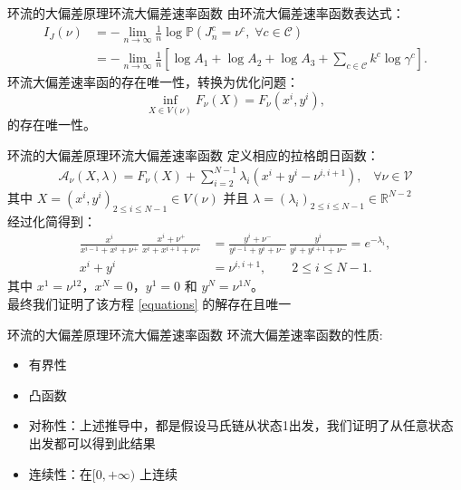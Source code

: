 \documentclass{beamer}
\begin{document}
\begin{frame}{环流的大偏差原理}{环流大偏差速率函数}
	由环流大偏差速率函数表达式：
	\begin{equation*}
		\begin{split}
			I_J(\nu) &= -\lim_{n\to\infty}\frac{1}{n}\log\mathbb{P}\left(J^c_n=\nu^c,\;\forall c\in\mathcal{C}\right)\\
			&= -\lim_{n\to\infty}\frac{1}{n}\left[\log A_1+\log A_2+\log A_3+\sum_{c\in\mathcal{C}}k^c\log\gamma^c\right].
		\end{split}
	\end{equation*}
	环流大偏差速率函的存在唯一性，转换为优化问题：
	\begin{equation*}
		\inf_{X\in V(\nu)}F_{\nu}(X) = F_{\nu}(x^i,y^i),
	\end{equation*}
	的存在唯一性。
\end{frame}

\begin{frame}{环流的大偏差原理}{环流大偏差速率函数}
	定义相应的拉格朗日函数：
	\begin{align*}
		\mathcal{A}_{\nu}(X,\lambda) = F_{\nu}(X) + \sum_{i=2}^{N-1} \lambda_i \left(x^{i} + y^{i} - \nu^{i,i+1}\right), \;\;\;\forall \nu\in\mathcal{V}
	\end{align*}
	其中 $X=(x^i,y^i)_{2\le i\le N-1}\in V(\nu)$ 并且 $\lambda=(\lambda_i)_{2\le i\le N-1}\in \mathbb{R}^{N-2}$ \\
	经过化简得到：
	\begin{equation}\label{equations}
		\begin{split}
			\frac{x^{i}}{x^{i-1}+x^{i}+\nu^+}
			\,\frac{x^{i}+\nu^+}{x^{i}+x^{i+1}+\nu^+}
			&= \frac{y^{i}+\nu^-}{y^{i-1}+y^{i}+\nu^-}
			\,\frac{y^{i}}{y^{i}+y^{i+1}+\nu^-}=e^{-\lambda_i},\\
			x^{i} + y^{i} &= \nu^{i,i+1},\qquad 2\le i\le N-1.
		\end{split}
	\end{equation}
	其中 $x^1=\nu^{12}$，$x^N=0$，$y^1=0$ 和 $y^N=\nu^{1N}$。\\
	最终我们证明了该方程 \ref{equations} 的解存在且唯一
\end{frame}

\begin{frame}{环流的大偏差原理}{环流大偏差速率函数}
	环流大偏差速率函数的性质:
	\begin{itemize}
		\item 有界性
		\item 凸函数
		\item 对称性：上述推导中，都是假设马氏链从状态1出发，我们证明了从任意状态出发都可以得到此结果
		\item 连续性：在$[0, +\infty)$ 上连续
	\end{itemize}
\end{frame}
\end{document}
